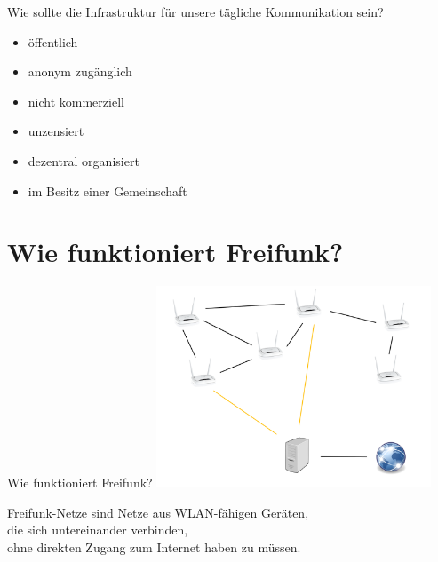 \documentclass{beamer}
\begin{document}



\begin{frame}{Wie sollte die Infrastruktur für unsere tägliche Kommunikation sein?}
\vfill
\begin{itemize}
\pause\item öffentlich
\pause\item anonym zugänglich
\pause\item nicht kommerziell
\pause\item unzensiert
\pause\item dezentral organisiert
\pause\item im Besitz einer Gemeinschaft
\end{itemize}
\vfill
\end{frame}


\section{Wie funktioniert Freifunk?}
\begin{frame}{Wie funktioniert Freifunk?}
\vfill
\centering
\includegraphics[height=6cm]{images/meshing}

Freifunk-Netze sind Netze aus WLAN-fähigen Geräten,\\ die sich untereinander verbinden,\\ ohne direkten Zugang zum Internet haben zu müssen.
\vfill
\end{frame}
\end{document}
